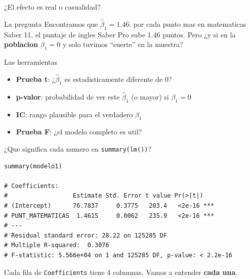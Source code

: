 \documentclass[aspectratio=169, 11pt]{beamer}
\begin{document}
\begin{frame}{¿El efecto es real o casualidad?}
\begin{exampleblock}{La pregunta}
\small
Encontramos que $\hat{\beta}_1 = 1.46$: por cada punto mas en matematicas Saber 11, el puntaje de ingles Saber Pro sube 1.46 puntos. Pero ¿y si en la \textbf{poblacion} $\beta_1 = 0$ y solo tuvimos ``suerte'' en la muestra?
\end{exampleblock}

\vspace{0.2cm}
\begin{block}{Las herramientas}
\begin{itemize}\setlength{\itemsep}{3pt}
  \item \textbf{Prueba t}: ¿$\hat{\beta}_1$ es estadisticamente diferente de 0?
  \item \textbf{p-valor}: probabilidad de ver este $\hat{\beta}_1$ (o mayor) si $\beta_1 = 0$
  \item \textbf{IC}: rango plausible para el verdadero $\beta_1$
  \item \textbf{Prueba F}: ¿el modelo completo es util?
\end{itemize}
\end{block}
\end{frame}

\begin{frame}[fragile]{¿Que significa cada numero en \texttt{summary(lm())}?}
\begin{lstlisting}[basicstyle=\ttfamily\scriptsize]
summary(modelo1)

# Coefficients:
#                  Estimate Std. Error t value Pr(>|t|)
# (Intercept)      76.7837     0.3775   203.4   <2e-16 ***
# PUNT_MATEMATICAS  1.4615     0.0062   235.9   <2e-16 ***
# ---
# Residual standard error: 28.22 on 125285 DF
# Multiple R-squared:  0.3076
# F-statistic: 5.566e+04 on 1 and 125285 DF, p-value: < 2.2e-16
\end{lstlisting}

\vspace{0.2cm}
\small
Cada fila de \texttt{Coefficients} tiene 4 columnas. Vamos a entender \textbf{cada una}.
\end{frame}
\end{document}
